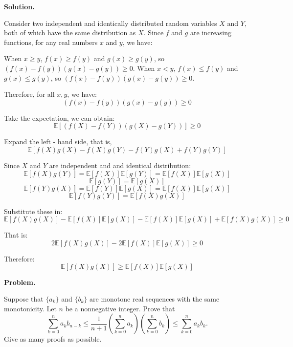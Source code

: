 \documentclass[12pt, a4paper, oneside]{ctexart}
\newcounter{problemname}
\newenvironment{problem}{\begin{shaded}\stepcounter{problemname}\par\noindent\textbf{Problem\arabic{problemname}. }}{\end{shaded}\par}
\newenvironment{solution}{\par\noindent\textbf{Solution. }}{\par}
\begin{document}
\begin{solution}


Consider two independent and identically distributed random variables $ X $ and $ Y $, both of which have the same distribution as $ X $. Since $ f $ and $ g $ are increasing functions, for any real numbers $ x $ and $ y $, we have:

When $ x \geq y $, $ f(x) \geq f(y) $ and $ g(x) \geq g(y) $, so $ (f(x) - f(y))(g(x) - g(y)) \geq 0 $.
When $ x < y $, $ f(x) \leq f(y) $ and $ g(x) \leq g(y) $, so $ (f(x) - f(y))(g(x) - g(y)) \geq 0 $.

Therefore, for all $ x, y $, we have:
$$
(f(x) - f(y))(g(x) - g(y)) \geq 0
$$

Take the expectation, we can obtain:
$$
\mathbb{E}[(f(X) - f(Y))(g(X) - g(Y))] \geq 0
$$

Expand the left - hand side, that is, 
$$\mathbb{E}[f(X)g(X)-f(X)g(Y)-f(Y)g(X)+f(Y)g(Y)]$$

Since $ X $ and $ Y $ are independent and and identical distribution:
$$
\mathbb{E}[f(X)g(Y)]=\mathbb{E}[f(X)]\mathbb{E}[g(Y)]=\mathbb{E}[f(X)]\mathbb{E}[g(X)]
$$
$$\mathbb{E}[g(Y)] = \mathbb{E}[g(X)]
$$
$$
\mathbb{E}[f(Y)g(X)]=\mathbb{E}[f(Y)]\mathbb{E}[g(X)]=\mathbb{E}[f(X)]\mathbb{E}[g(X)]
$$
$$
\mathbb{E}[f(Y)g(Y)]=\mathbb{E}[f(X)g(X)]
$$ 

Substitute these in:
$$\mathbb{E}[f(X)g(X)]-\mathbb{E}[f(X)]\mathbb{E}[g(X)]-\mathbb{E}[f(X)]\mathbb{E}[g(X)]+\mathbb{E}[f(X)g(X)] \geq 0$$

That is:
$$
2\mathbb{E}[f(X)g(X)] - 2\mathbb{E}[f(X)]\mathbb{E}[g(X)] \geq 0
$$

Therefore:
$$
\mathbb{E}[f(X)g(X)] \geq \mathbb{E}[f(X)]\mathbb{E}[g(X)]
$$


\end{solution}


\begin{problem}
	
\noindent Suppose that $ \{a_k\} $ and $ \{b_k\} $ are monotone real sequences with the same monotonicity. Let $ n $ be a nonnegative integer. Prove that
$$
\sum_{k=0}^n a_k b_{n-k} \leq \frac{1}{n+1} \left( \sum_{k=0}^n a_k \right) \left( \sum_{k=0}^n b_k \right) \leq \sum_{k=0}^n a_k b_k.
$$
Give as many proofs as possible.
	
\end{problem}
\end{document}
